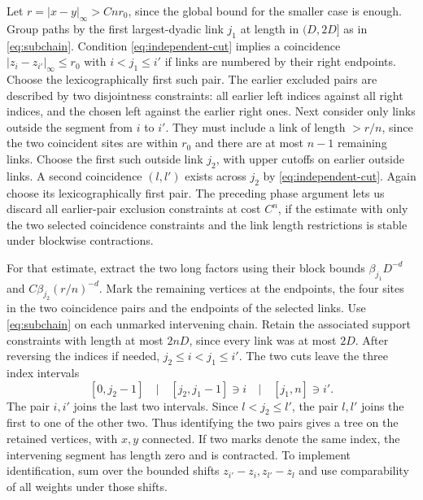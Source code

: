 \documentclass[11pt]{article}
\begin{document}
Let \(r=|x-y|_\infty>C n r_0\), since the global bound for the smaller case is enough. Group paths by the first largest-dyadic link \(j_1\) at length in \((D,2D]\) as in \eqref{eq:subchain}. Condition \eqref{eq:independent-cut} implies a coincidence \(|z_i-z_{i'}|_\infty\le r_0\) with \(i<j_1\le i'\) if links are numbered by their right endpoints. Choose the lexicographically first such pair. The earlier excluded pairs are described by two disjointness constraints: all earlier left indices against all right indices, and the chosen left against the earlier right ones. Next consider only links outside the segment from \(i\) to \(i'\). They must include a link of length \(> r/n\), since the two coincident sites are within \(r_0\) and there are at most \(n-1\) remaining links. Choose the first such outside link \(j_2\), with upper cutoffs on earlier outside links. A second coincidence \((l,l')\) exists across \(j_2\) by \eqref{eq:independent-cut}. Again choose its lexicographically first pair. The preceding phase argument lets us discard all earlier-pair exclusion constraints at cost \(C^n\), if the estimate with only the two selected coincidence constraints and the link length restrictions is stable under blockwise contractions.

For that estimate, extract the two long factors using their block bounds \(\beta_{j_1}D^{-d}\) and \(C\beta_{j_2}(r/n)^{-d}\). Mark the remaining vertices at the endpoints, the four sites in the two coincidence pairs and the endpoints of the selected links. Use \eqref{eq:subchain} on each unmarked intervening chain. Retain the associated support constraints with length at most \(2nD\), since every link was at most \(2D\). After reversing the indices if needed, \(j_2\le i<j_1\le i'\). The two cuts leave the three index intervals
\[
    [0,j_2-1]\quad\big|\quad[j_2,j_1-1]\ni i\quad\big|\quad[j_1,n]\ni i'.
\]
The pair \(i,i'\) joins the last two intervals. Since \(l<j_2\le l'\), the pair \(l,l'\) joins the first to one of the other two. Thus identifying the two pairs gives a tree on the retained vertices, with \(x,y\) connected. If two marks denote the same index, the intervening segment has length zero and is contracted. To implement identification, sum over the bounded shifts \(z_{i'}-z_i,z_{l'}-z_l\) and use comparability of all weights under those shifts.
\end{document}
